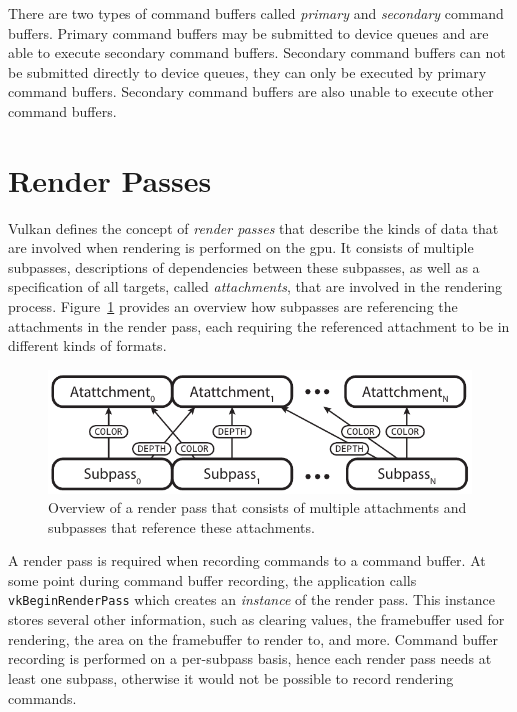     There are two types of command buffers called \textit{primary} and \textit{secondary} command buffers.
    Primary command buffers may be submitted to device queues and are able to execute secondary command buffers.
    Secondary command buffers can not be submitted directly to device queues, they can only be executed by primary command buffers.
    Secondary command buffers are also unable to execute other command buffers.

  \section{Render Passes}
  \label{sec:RenderPassesOverview}
    Vulkan defines the concept of \textit{render passes} that describe the kinds of data that are involved when rendering is performed on the \gls{gpu}.
    It consists of multiple subpasses, descriptions of dependencies between these subpasses, as well as a specification of all targets, called \textit{attachments}, that are involved in the rendering process. Figure~\ref{fig:RenderPassOverview} provides an overview how subpasses are referencing the attachments in the render pass, each requiring the referenced attachment to be in different kinds of formats.

    \begin{figure}
      \centering
      \includegraphics[width=\textwidth]{Main/Images/RenderPassOverview}
      \caption{Overview of a render pass that consists of multiple attachments and subpasses that reference these attachments.}
      \label{fig:RenderPassOverview}
    \end{figure}

    A render pass is required when recording commands to a command buffer.
    At some point during command buffer recording, the application calls \lstinline{vkBeginRenderPass} which creates an \textit{instance} of the render pass.
    This instance stores several other information, such as clearing values, the framebuffer used for rendering, the area on the framebuffer to render to, and more.
    Command buffer recording is performed on a per-subpass basis, hence each render pass needs at least one subpass, otherwise it would not be possible to record rendering commands.

